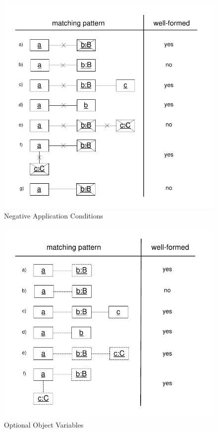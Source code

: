 \begin{figure}[htbp]
  \centering
  \includegraphics[scale=1]{figures/negativeObjects}
  \caption{Negative Application Conditions}
  \label{fig:negativeObjects}
\end{figure}

\begin{figure}[htbp]
  \centering
  \includegraphics[scale=1]{figures/optionalObjects}
  \caption{Optional Object Variables}
  \label{fig:optionalObjects}
\end{figure}

